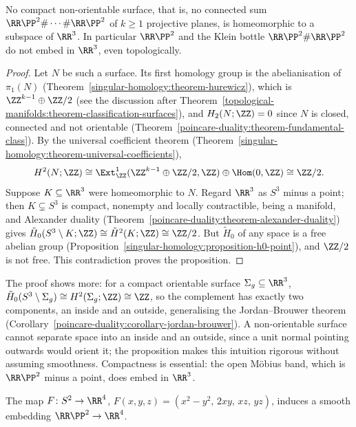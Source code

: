 \begin{proposition}\label{smooth-manifolds:proposition-no-embedding-r3}
No compact non-orientable surface, that is, no connected sum $\RR\PP^2 \# \cdots \# \RR\PP^2$ of $k \geq 1$ projective planes, is homeomorphic to a subspace of $\RR^3$. In particular $\RR\PP^2$ and the Klein bottle
$\RR\PP^2 \# \RR\PP^2$ do not embed in $\RR^3$, even topologically.
\end{proposition}

\begin{proof}
Let $N$ be such a surface. Its first homology group is the abelianisation of $\pi_1(N)$ (Theorem~\ref{singular-homology:theorem-hurewicz}), which is $\ZZ^{k-1} \oplus \ZZ/2$ (see the discussion after
Theorem~\ref{topological-manifolds:theorem-classification-surfaces}), and $H_2(N; \ZZ) = 0$ since $N$ is closed, connected and not orientable (Theorem~\ref{poincare-duality:theorem-fundamental-class}). By the universal
coefficient theorem (Theorem~\ref{singular-homology:theorem-universal-coefficients}),
\[
H^2(N; \ZZ) \cong \Ext^1_\ZZ(\ZZ^{k-1} \oplus \ZZ/2, \ZZ) \oplus \Hom(0, \ZZ) \cong \ZZ/2 .
\]
Suppose $K \subseteq \RR^3$ were homeomorphic to $N$. Regard $\RR^3$ as $S^3$ minus a point; then $K \subsetneq S^3$ is compact, nonempty and locally contractible, being a manifold, and Alexander duality
(Theorem~\ref{poincare-duality:theorem-alexander-duality}) gives $\tilde{H}_0(S^3 \setminus K; \ZZ) \cong \tilde{H}^2(K; \ZZ) \cong \ZZ/2$. But $\tilde{H}_0$ of any space is a free abelian group
(Proposition~\ref{singular-homology:proposition-h0-point}), and $\ZZ/2$ is not free. This contradiction proves the proposition.
\end{proof}

The proof shows more: for a compact orientable surface $\Sigma_g \subseteq \RR^3$, $\tilde{H}_0(S^3 \setminus \Sigma_g) \cong H^2(\Sigma_g; \ZZ) \cong \ZZ$, so the complement has exactly two components, an inside and an outside,
generalising the Jordan--Brouwer theorem (Corollary~\ref{poincare-duality:corollary-jordan-brouwer}). A non-orientable surface cannot separate space into an inside and an outside, since a unit normal pointing outwards
would orient it; the proposition makes this intuition rigorous without assuming smoothness. Compactness is essential: the open M\"obius band, which is $\RR\PP^2$ minus a point, does embed in $\RR^3$.

\begin{proposition}\label{smooth-manifolds:proposition-rp2-r4}
The map $F \colon S^2 \to \RR^4$, $F(x, y, z) = (x^2 - y^2, \, 2xy, \, xz, \, yz)$, induces a smooth embedding $\RR\PP^2 \to \RR^4$.
\end{proposition}

